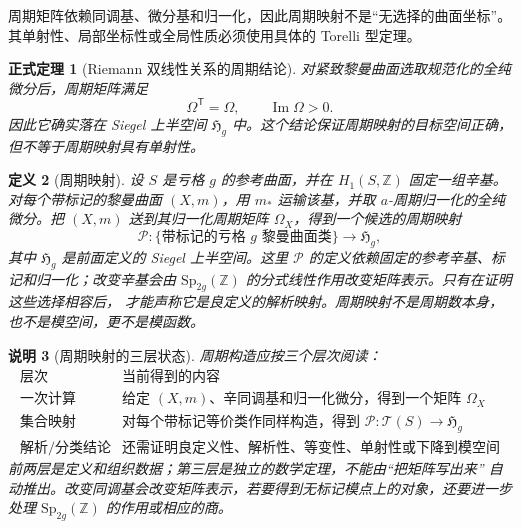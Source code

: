 \documentclass[UTF8,fontset=none,a4paper,11pt]{ctexart}
\theoremstyle{foundation-definition}
\newtheorem{definition}{定义}[section]
\theoremstyle{foundation-theorem}
\newtheorem{theorem}[definition]{正式定理}
\theoremstyle{foundation-proposition}
\theoremstyle{foundation-example}
\theoremstyle{foundation-remark}
\newtheorem{remark}[definition]{说明}
\theoremstyle{foundation-theorem}
\newcommand{\T}{\mathcal T}
\begin{document}
周期矩阵依赖同调基、微分基和归一化，因此周期映射不是“无选择的曲面坐标”。其单射性、局部坐标性或全局性质必须使用具体的 Torelli 型定理。

\begin{theorem}[Riemann 双线性关系的周期结论]
对紧致黎曼曲面选取规范化的全纯微分后，周期矩阵满足
\[
\Omega^{\mathsf T}=\Omega,\qquad \operatorname{Im}\Omega>0.
\]
因此它确实落在 Siegel 上半空间 \(\mathfrak H_g\) 中。这个结论保证周期映射的目标空间正确，但不等于周期映射具有单射性。
\end{theorem}

\begin{definition}[周期映射]\label{def:period-map}
设 \(S\) 是亏格 \(g\) 的参考曲面，并在 \(H_1(S,\mathbb Z)\) 固定一组辛基。对每个带标记的黎曼曲面 \((X,m)\)，用 \(m_*\) 运输该基，并取 \(a\)-周期归一化的全纯微分。把 \((X,m)\) 送到其归一化周期矩阵 \(\Omega_X\)，得到一个候选的周期映射
\[
\mathcal P:\{\text{带标记的亏格 }g\text{ 黎曼曲面类}\}
\longrightarrow\mathfrak H_g,
\]
其中 \(\mathfrak H_g\) 是前面定义的 Siegel 上半空间。这里 \(\mathcal P\) 的定义依赖固定的参考辛基、标记和归一化；改变辛基会由
\(\mathrm{Sp}_{2g}(\mathbb Z)\) 的分式线性作用改变矩阵表示。只有在证明这些选择相容后，
才能声称它是良定义的解析映射。周期映射不是周期数本身，也不是模空间，更不是模函数。
\end{definition}

\begin{remark}[周期映射的三层状态]\label{rem:period-map-status}
周期构造应按三个层次阅读：
\[
\begin{array}{c|l}
\text{层次}&\text{当前得到的内容}\\
\hline
\text{一次计算}&\text{给定 }(X,m)\text{、辛同调基和归一化微分，得到一个矩阵 }\Omega_X\\
\text{集合映射}&\text{对每个带标记等价类作同样构造，得到 }\mathcal P:\T(S)\to\mathfrak H_g\\
\text{解析/分类结论}&\text{还需证明良定义性、解析性、等变性、单射性或下降到模空间}
\end{array}
\]
前两层是定义和组织数据；第三层是独立的数学定理，不能由“把矩阵写出来”
自动推出。改变同调基会改变矩阵表示，若要得到无标记模点上的对象，还要进一步
处理 \(\mathrm{Sp}_{2g}(\mathbb Z)\) 的作用或相应的商。
\end{remark}
\end{document}
